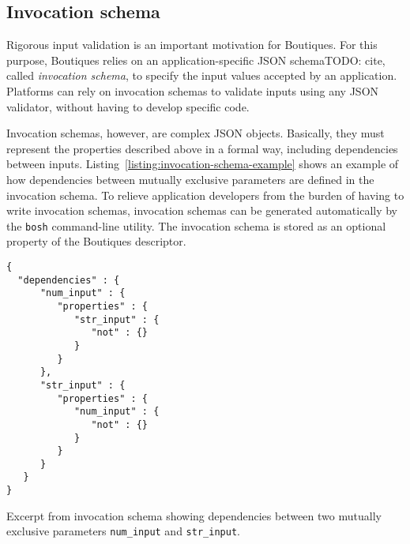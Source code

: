 \documentclass[a4paper,num-refs]{oup-contemporary}
\newcommand{\todo}[1]{\color{red}TODO: #1\color{black}}
\newcommand{\boutiques}{Boutiques\xspace}
\newcommand{\notimplementedyet}[1]{\color{blue}\emph{#1}\footnote{Still needs to be implemented}\color{black}\xspace}
\begin{document}
\subsection{Invocation schema}
\label{sec:invocation-schema}

Rigorous input validation is an important motivation for
\boutiques. For this purpose, \boutiques relies on an
application-specific JSON schema\todo{cite}, called \emph{invocation schema}, to
specify the input values accepted by an application. Platforms can
rely on invocation schemas to validate inputs using
any JSON validator, without having to develop specific code.

Invocation schemas, however, are complex JSON objects. Basically, they
must represent the properties described above in a formal way,
including dependencies between
inputs. Listing~\ref{listing:invocation-schema-example} shows an
example of how dependencies between mutually exclusive parameters are
defined in the invocation schema. To relieve application developers
from the burden of having to write invocation schemas, invocation
schemas can be generated automatically by the \texttt{bosh}
command-line utility. The invocation schema is stored as an optional
property of the \boutiques descriptor.


\begin{listing}
\begin{verbatim}
{
  "dependencies" : {
      "num_input" : {
         "properties" : {
            "str_input" : {
               "not" : {}
            }
         }
      },
      "str_input" : {
         "properties" : {
            "num_input" : {
               "not" : {}
            }
         }
      }
   }
}
\end{verbatim}
\caption{Excerpt from invocation schema showing dependencies between
  two mutually exclusive parameters \texttt{num\_input} and
  \texttt{str\_input}.}
\label{listing:invocation-schema-example}
\end{listing}
\end{document}
